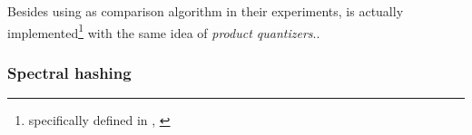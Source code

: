 Besides using \pq{} as comparison algorithm in their experiments, \qs{} is actually implemented\footnote{specifically defined in , \cite[p. 5]{wagner17}} with the same idea of \textit{product quantizers}..

\subsubsection{Spectral hashing}

